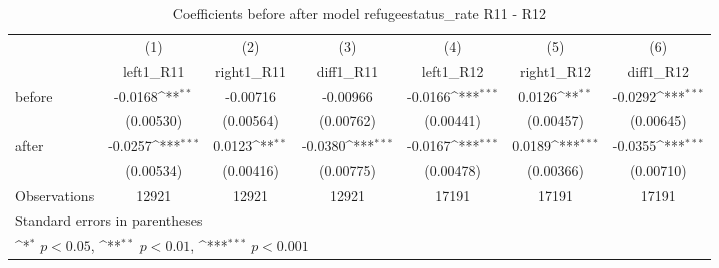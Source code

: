 \begin{table}[htbp]\centering
\def\sym#1{\ifmmode^{#1}\else\(^{#1}\)\fi}
\caption{Coefficients before after model refugeestatus\_rate R11 - R12}
\begin{tabular}{l*{6}{c}}
\hline\hline
                    &\multicolumn{1}{c}{(1)}&\multicolumn{1}{c}{(2)}&\multicolumn{1}{c}{(3)}&\multicolumn{1}{c}{(4)}&\multicolumn{1}{c}{(5)}&\multicolumn{1}{c}{(6)}\\
                    &\multicolumn{1}{c}{left1\_R11}&\multicolumn{1}{c}{right1\_R11}&\multicolumn{1}{c}{diff1\_R11}&\multicolumn{1}{c}{left1\_R12}&\multicolumn{1}{c}{right1\_R12}&\multicolumn{1}{c}{diff1\_R12}\\
\hline
before              &     -0.0168\sym{**} &    -0.00716         &    -0.00966         &     -0.0166\sym{***}&      0.0126\sym{**} &     -0.0292\sym{***}\\
                    &   (0.00530)         &   (0.00564)         &   (0.00762)         &   (0.00441)         &   (0.00457)         &   (0.00645)         \\
[1em]
after               &     -0.0257\sym{***}&      0.0123\sym{**} &     -0.0380\sym{***}&     -0.0167\sym{***}&      0.0189\sym{***}&     -0.0355\sym{***}\\
                    &   (0.00534)         &   (0.00416)         &   (0.00775)         &   (0.00478)         &   (0.00366)         &   (0.00710)         \\
\hline
Observations        &       12921         &       12921         &       12921         &       17191         &       17191         &       17191         \\
\hline\hline
\multicolumn{7}{l}{\footnotesize Standard errors in parentheses}\\
\multicolumn{7}{l}{\footnotesize \sym{*} \(p<0.05\), \sym{**} \(p<0.01\), \sym{***} \(p<0.001\)}\\
\end{tabular}
\end{table}
